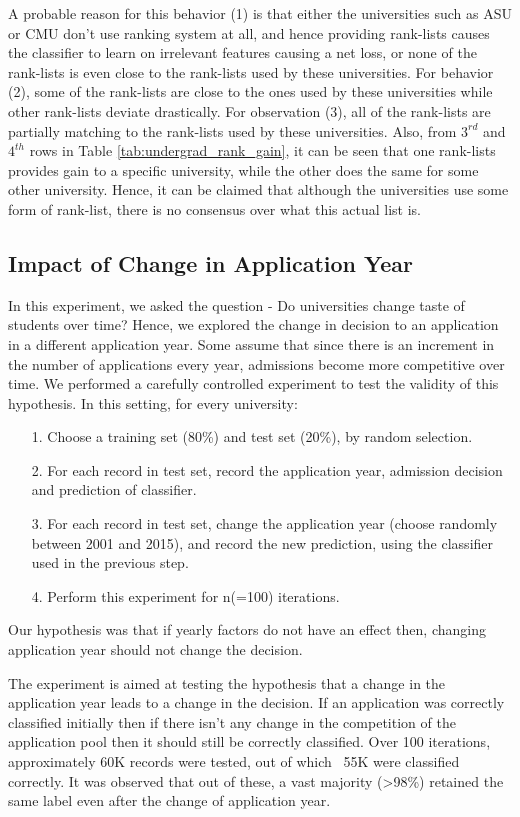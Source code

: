 \documentclass{sig-alternate-05-2015}
\begin{document}
A probable reason for this behavior (1) is that either the universities such as ASU or CMU don't use ranking system at all, and hence providing rank-lists causes the classifier to learn on irrelevant features causing a net loss, or none of the rank-lists is even close to the rank-lists used by these universities. For behavior (2), some of the rank-lists are close to the ones used by these universities while other rank-lists deviate drastically. For observation (3), all of the rank-lists are partially matching to the rank-lists used by these universities. Also, from $3^{rd}$ and $4^{th}$ rows in Table \ref{tab:undergrad_rank_gain}, it can be seen that one rank-lists provides gain to a specific university, while the other does the same for some other university. Hence, it can be claimed that although the universities use some form of rank-list, there is no consensus over what this actual list is.


\subsection{Impact of Change in Application Year}
\label{subsec:year-change-exp}
In this experiment, we asked the question - Do universities change taste of students over time? Hence, we explored the change in decision to an application in a different application year. Some assume that since there is an increment in the number of applications every year, admissions become more competitive over time. We performed a carefully controlled experiment to test the validity of this hypothesis. In this setting, for every university:
\begin{itemize}
\item[1.]Choose a training set (80\%) and test set (20\%), by random selection.
\item[2.]For each record in test set, record the application year, admission decision and prediction of classifier.
\item[3.]For each record in test set, change the application year (choose randomly between 2001 and 2015), and record the new prediction, using the classifier used in the previous step.
\item[4.]Perform this experiment for n(=100) iterations.
\end{itemize}
Our hypothesis was that if yearly factors do not have an effect then, changing application year should not change the decision.

The experiment is aimed at testing the hypothesis that a change in the application year leads to a change in the decision. If an application was correctly classified initially then if there isn't any change in the competition of the application pool then it should still be correctly classified. Over 100 iterations, approximately 60K records were tested, out of which ~55K were classified correctly. It was observed that out of these, a vast majority (>98\%) retained the same label even after the change of application year.
\end{document}
